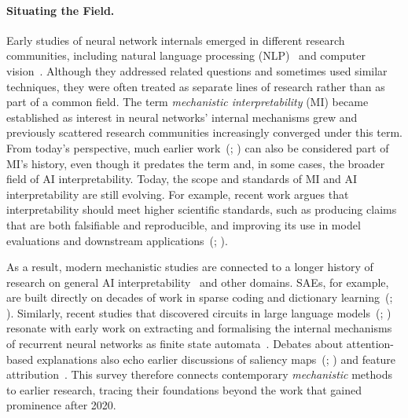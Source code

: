 \paragraph{Situating the Field.}
Early studies of neural network internals emerged in different research communities, including natural language processing (NLP)~ and computer vision~. Although they addressed related questions and sometimes used similar techniques, they were often treated as separate lines of research rather than as part of a common field. The term \emph{mechanistic interpretability} (MI) became established as interest in neural networks' internal mechanisms grew and previously
scattered research communities increasingly converged under this term. From today's perspective, much earlier work~(; ) can also be considered part of MI's history, even though it predates the term and, in some cases, the broader field of AI interpretability. Today, the scope and standards of MI and AI interpretability are still evolving. For example, recent work argues that interpretability should meet higher scientific standards, such as producing claims that are both falsifiable and reproducible, and improving its use in model evaluations and downstream applications~(; ).

As a result, modern mechanistic studies are connected to a longer history of research on general AI interpretability~ and other domains. SAEs, for example, are built directly on decades of work in sparse coding and dictionary learning~(; ). Similarly, recent studies that discovered circuits in large language models~(; ) resonate with early work on extracting and formalising the internal mechanisms of recurrent neural networks as finite state automata~. Debates about attention-based explanations also echo earlier discussions of saliency maps~(; ) and feature attribution~. %
This survey therefore connects contemporary \emph{mechanistic} methods to earlier research, tracing their foundations beyond the work that gained prominence after 2020.



